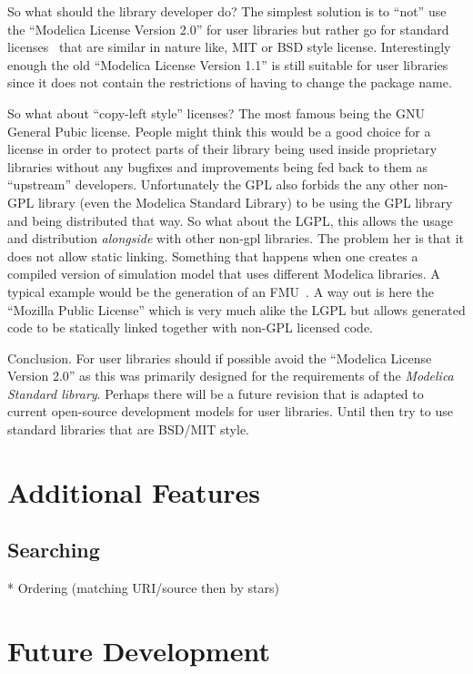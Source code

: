 \documentclass[11pt,a4paper,twocolumn]{article}
\begin{document}
So what should the library developer do? The simplest solution is to
``not'' use the ``Modelica License Version 2.0'' for user libraries
but rather go for standard licenses~\parencite{lic} that are similar
in  nature like, MIT or BSD style license. Interestingly enough the
old ``Modelica License Version 1.1'' is still suitable for user
libraries since it does not contain the restrictions of having to
change the package name.

So what about ``copy-left style'' licenses? The most famous being the
GNU General Pubic license. People might think this
would be a good choice for a license in order
to protect parts of their library being used inside proprietary
libraries without any bugfixes and improvements being fed back to them
as ``upstream'' developers. Unfortunately the GPL also forbids the any
other non-GPL library (even the Modelica Standard Library) to be using
the GPL library and being distributed that way. So what about the
LGPL, this allows the usage and distribution \emph{alongside} with
other non-gpl libraries. The problem her is that it does not allow
static linking. Something that happens when one creates a compiled
version of simulation model that uses different Modelica libraries.
A typical example would be the generation of an FMU~\parencite{FMI}.
A way out is here the ``Mozilla Public License'' which is very much
alike the LGPL but allows generated code to be statically linked
together with non-GPL licensed code.

Conclusion. For user libraries should if possible avoid the ``Modelica
License Version 2.0'' as this was primarily designed for the
requirements of the \emph{Modelica Standard library}. Perhaps there
will be a future revision that is adapted to current open-source
development models for user libraries. Until then try to use standard
libraries that are BSD/MIT style.


\section{Additional Features}

\subsection{Searching}

* Ordering (matching URI/source then by stars)

\section{Future Development}
\end{document}
